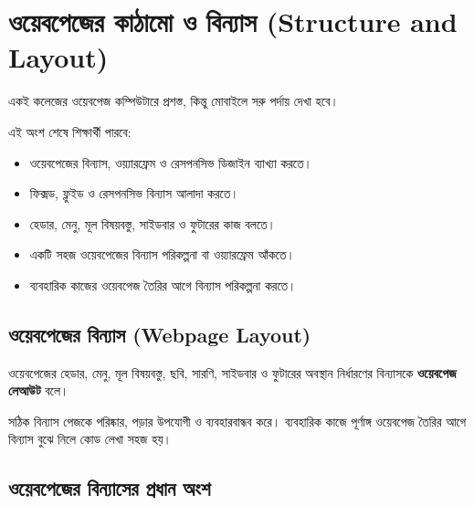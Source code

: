 \section{ওয়েবপেজের কাঠামো ও বিন্যাস (Structure and Layout)}

একই কলেজের ওয়েবপেজ কম্পিউটারে প্রশস্ত, কিন্তু মোবাইলে সরু পর্দায় দেখা হবে।



\begin{learningbox}
এই অংশ শেষে শিক্ষার্থী পারবে:
\begin{itemize}
\item ওয়েবপেজের বিন্যাস, ওয়্যারফ্রেম ও রেসপনসিভ ডিজাইন ব্যাখ্যা করতে।
\item ফিক্সড, ফ্লুইড ও রেসপনসিভ বিন্যাস আলাদা করতে।
\item হেডার, মেনু, মূল বিষয়বস্তু, সাইডবার ও ফুটারের কাজ বলতে।
\item একটি সহজ ওয়েবপেজের বিন্যাস পরিকল্পনা বা ওয়্যারফ্রেম আঁকতে।
\item ব্যবহারিক কাজের ওয়েবপেজ তৈরির আগে বিন্যাস পরিকল্পনা করতে।
\end{itemize}
\end{learningbox}

\subsection{ওয়েবপেজের বিন্যাস (Webpage Layout)}

\begin{definitionbox}{}
ওয়েবপেজের হেডার, মেনু, মূল বিষয়বস্তু, ছবি, সারণি, সাইডবার ও ফুটারের অবস্থান নির্ধারণের বিন্যাসকে \textbf{ওয়েবপেজ লেআউট} বলে।
\end{definitionbox}

সঠিক বিন্যাস পেজকে পরিষ্কার, পড়ার উপযোগী ও ব্যবহারবান্ধব করে। ব্যবহারিক কাজে পূর্ণাঙ্গ ওয়েবপেজ তৈরির আগে বিন্যাস বুঝে নিলে কোড লেখা সহজ হয়।

\subsection{ওয়েবপেজের বিন্যাসের প্রধান অংশ}

